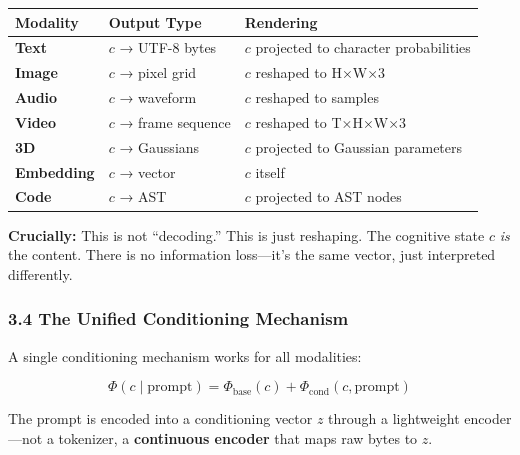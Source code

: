 \documentclass[
  11pt,
  a4paper,
]{article}
\begin{document}
\begin{longtable}[]{@{}
  >{\raggedright\arraybackslash}p{}
  >{\raggedright\arraybackslash}p{}
  >{\raggedright\arraybackslash}p{}@{}}
\toprule\noalign{}
\begin{minipage}[b]{\linewidth}\raggedright
Modality
\end{minipage} & \begin{minipage}[b]{\linewidth}\raggedright
Output Type
\end{minipage} & \begin{minipage}[b]{\linewidth}\raggedright
Rendering
\end{minipage} \\
\midrule\noalign{}
\endhead
\bottomrule\noalign{}
\endlastfoot
\textbf{Text} & \(c\) → UTF-8 bytes & \(c\) projected to character
probabilities \\
\textbf{Image} & \(c\) → pixel grid & \(c\) reshaped to H×W×3 \\
\textbf{Audio} & \(c\) → waveform & \(c\) reshaped to samples \\
\textbf{Video} & \(c\) → frame sequence & \(c\) reshaped to T×H×W×3 \\
\textbf{3D} & \(c\) → Gaussians & \(c\) projected to Gaussian
parameters \\
\textbf{Embedding} & \(c\) → vector & \(c\) itself \\
\textbf{Code} & \(c\) → AST & \(c\) projected to AST nodes \\
\end{longtable}

\textbf{Crucially:} This is not ``decoding.'' This is just reshaping.
The cognitive state \(c\) \emph{is} the content. There is no information
loss---it's the same vector, just interpreted differently.

\subsubsection{3.4 The Unified Conditioning
Mechanism}\label{the-unified-conditioning-mechanism}

A single conditioning mechanism works for all modalities:

\[
\Phi(c \mid \text{prompt}) = \Phi_{\text{base}}(c) + \Phi_{\text{cond}}(c, \text{prompt})
\]

The prompt is encoded into a conditioning vector \(z\) through a
lightweight encoder---not a tokenizer, a \textbf{continuous encoder}
that maps raw bytes to \(z\).
\end{document}
